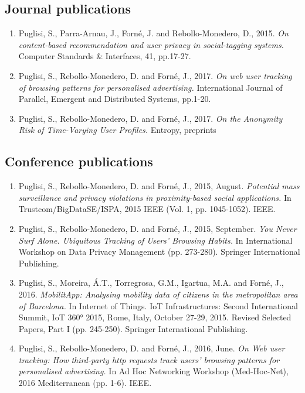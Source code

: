 \subsection{Journal publications}
\begin{enumerate}
    \item Puglisi, S., Parra-Arnau, J., Forn\'e, J. and Rebollo-Monedero, D., 2015. \emph{On content-based recommendation and user privacy in social-tagging systems.} Computer Standards \& Interfaces, 41, pp.17-27.
          
    \item Puglisi, S., Rebollo-Monedero, D. and Forn\'e, J., 2017. \emph{On web user tracking of browsing patterns for personalised advertising.} International Journal of Parallel, Emergent and Distributed Systems, pp.1-20.
    
    \item Puglisi, S., Rebollo-Monedero, D. and Forn\'e, J., 2017. \emph{On the Anonymity Risk of Time-Varying User Profiles.}
          Entropy, preprints
\end{enumerate}

\subsection{Conference publications}
\begin{enumerate}

    \item Puglisi, S., Rebollo-Monedero, D. and Forn\'e, J., 2015, August. \emph{Potential mass surveillance and privacy violations in proximity-based social applications.} In Trustcom/BigDataSE/ISPA, 2015 IEEE (Vol. 1, pp. 1045-1052). IEEE.
    
    \item Puglisi, S., Rebollo-Monedero, D. and Forn\'e, J., 2015, September. \emph{You Never Surf Alone. Ubiquitous Tracking of Users’ Browsing Habits.} In International Workshop on Data Privacy Management (pp. 273-280). Springer International Publishing.
    
    \item Puglisi, S., Moreira, \'A.T., Torregrosa, G.M., Igartua, M.A. and Forn\'e, J., 2016. \emph{MobilitApp: Analysing mobility data of citizens in the metropolitan area of Barcelona.} In Internet of Things. IoT Infrastructures: Second International Summit, IoT 360° 2015, Rome, Italy, October 27-29, 2015. Revised Selected Papers, Part I (pp. 245-250). Springer International Publishing.
    
    \item Puglisi, S., Rebollo-Monedero, D. and Forn\'e, J., 2016, June. \emph{On Web user tracking: How third-party http requests track users' browsing patterns for personalised advertising.} In Ad Hoc Networking Workshop (Med-Hoc-Net), 2016 Mediterranean (pp. 1-6). IEEE. 

\end{enumerate}

